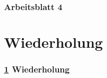 \documentclass[9pt,german]{beamer}%
\begin{document}
\maketitle%
\addtocounter{framenumber}{-1}%

\begin{frame}
  \frametitle{Arbeitsblatt 4}%
\tableofcontents[hideallsubsections]
\end{frame}
\setcounter{exercise}{11}


\section{Wiederholung}\label{K:wdh}
\begin{frame}
  \frametitle{\ref{K:wdh} Wiederholung}%
\tableofcontents[current]
\end{frame}


\def\stitle{Rundungsfehler: Ausl\"oschung}
\end{document}
